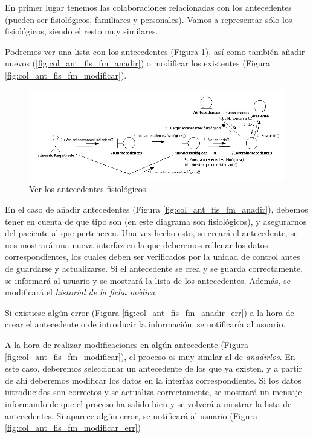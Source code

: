 \documentclass[a4paper,oneside,11pt]{book}
\begin{document}
			En primer lugar tenemos las colaboraciones relacionadas con los antecedentes (pueden ser fisiológicos, familiares y personales). Vamos a representar sólo los fisiológicos, siendo el resto muy similares.
			
			Podremos ver una lista con los antecedentes (Figura \ref{fig:col_ant_fis_fm}), así como también añadir nuevos (\ref{fig:col_ant_fis_fm_anadir}) o modificar los existentes (Figura \ref{fig:col_ant_fis_fm_modificar}).
			
			\bigskip
			\bigskip
			\begin{figure}[H]
			  \centering
			    \includegraphics[width=16cm]{img/jpg/colaboraciones/32_VerAntecedentesFisiologicos.jpg}
			  \caption{Ver los antecedentes fisiológicos}
			  \label{fig:col_ant_fis_fm}
			\end{figure}
			
			\bigskip
			En el caso de añadir antecedentes (Figura \ref{fig:col_ant_fis_fm_anadir}), debemos tener en cuenta de que tipo son (en este diagrama son fisiológicos), y asegurarnos del paciente al que pertenecen. Una vez hecho esto, se creará el antecedente, se nos mostrará una nueva interfaz en la que deberemos rellenar los datos correspondientes, los cuales deben ser verificados por la unidad de control antes de guardarse y actualizarse. Si el antecedente se crea y se guarda correctamente, se informará al usuario y se mostrará la lista de los antecedentes. Además, se modificará el \textit{historial de la ficha médica}.
			
			Si existiese algún error (Figura \ref{fig:col_ant_fis_fm_anadir_err}) a la hora de crear el antecedente o de introducir la información, se notificaría al usuario.
			
			A la hora de realizar modificaciones en algún antecedente (Figura \ref{fig:col_ant_fis_fm_modificar}), el proceso es muy similar al de \textit{añadirlos}. En este caso, deberemos seleccionar un antecedente de los que ya existen, y a partir de ahí deberemos modificar los datos en la interfaz correspondiente. Si los datos introducidos son correctos y se actualiza correctamente, se mostrará un mensaje informando de que el proceso ha salido bien y se volverá a mostrar la lista de antecedentes. Si aparece algún error, se notificará al usuario (Figura \ref{fig:col_ant_fis_fm_modificar_err})
			
\end{document}
